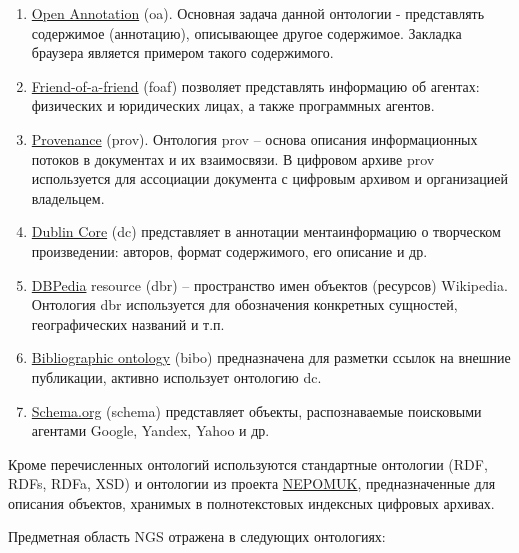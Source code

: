 \documentclass[a4paper,12pt,openany,final]{extreport}
\begin{document}
\begin{enumerate}
\def\labelenumi{\arabic{enumi}.}
\item
  \href{http://www.openannotation.org/}{{Open Annotation}} (oa).
  Основная задача данной онтологии - представлять содержимое
  (аннотацию), описывающее другое содержимое. Закладка браузера является
  примером такого содержимого.
\item
  \href{http://xmlns.com/foaf/spec/}{{Friend-of-a-friend}} (foaf)
  позволяет представлять информацию об агентах: физических и юридических
  лицах, а также программных агентов.
\item
  \href{https://www.w3.org/TR/prov-o/}{{Provenance}} (prov). Онтология
  prov -- основа описания информационных потоков в документах и их
  взаимосвязи. В цифровом архиве prov используется для ассоциации
  документа с цифровым архивом и организацией владельцем.
\item
  \href{http://dublincore.org/documents/dcmi-terms/}{{Dublin Core}} (dc)
  представляет в аннотации ментаинформацию о творческом произведении:
  авторов, формат содержимого, его описание и др.
\item
  \href{http://wiki.dbpedia.org/}{{DBPedia}} resource (dbr) --
  пространство имен объектов (ресурсов) Wikipedia. Онтология dbr
  используется для обозначения конкретных сущностей, географических
  названий и т.п.
\item
  \href{http://bibliographic-ontology.org/specification}{{Bibliographic
  ontology}} (bibo) предназначена для разметки ссылок на внешние
  публикации, активно использует онтологию dc.
\item
  \href{http://schema.org/}{{Schema.org}} (schema) представляет объекты,
  распознаваемые поисковыми агентами Google, Yandex, Yahoo и др.
\end{enumerate}

Кроме перечисленных онтологий используются стандартные онтологии (RDF,
RDFs, RDFa, XSD) и онтологии из проекта
\href{https://userbase.kde.org/Nepomuk}{{NEPOMUK}}, предназначенные для
описания объектов, хранимых в полнотекстовых индексных цифровых архивах.

Предметная область NGS отражена в следующих онтологиях:
\end{document}
